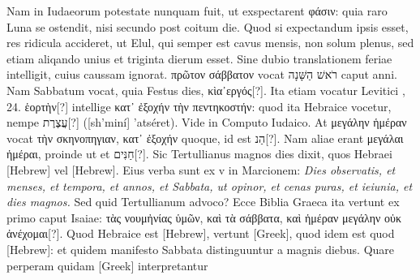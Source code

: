 Nam in Iudaeorum potestate
nunquam fuit, ut exspectarent \textgreek{φάσιν}:
 quia raro Luna se ostendit,
nisi secundo post coitum die.
Quod si expectandum ipsis esset,
res ridicula accideret, ut Elul, qui semper est cavus mensis, non solum
plenus, sed etiam aliqando unius et triginta dierum esset.
Sine dubio translationem feriae intelligit, cuius caussam ignorat.
\textgreek{πρῶτον σάββατον} vocat
 \texthebrew{רֹאשׁ הַשָּׁנָה‎}
 caput anni.
Nam Sabbatum vocat, quia Festus
dies, \textgreek{κὶα᾽εργός}[?].
Ita etiam vocatur Levitici , 24.
\textgreek{ἑορτὴν}[?]
 intellige
\textgreek{κατ᾽ ἐξοχήν τὴν πεντηκοστήν}:
 quod ita Hebraice vocetur, nempe \texthebrew{עֲצֶרֶת}[?] ([sh'miní] 'atséret).
Vide in Computo Iudaico.
At \textgreek{μεγάλην ἡμέραν}
 vocat \textgreek{τὴν σκηνοπηγιαν, κατ᾽ ἐξοχήν}
 quoque, id est \texthebrew{הַנ}[?].
Nam aliae erant \textgreek{μεγάλαι ἡμέραι},
proinde ut et \texthebrew{חַנִּים}[?].
Sic Tertullianus magnos dies dixit, quos
Hebraei \texthebrew{[Hebrew]} vel \texthebrew{[Hebrew]}.
Eius verba sunt ex v in Marcionem:
\textit{Dies observatis, et menses, et tempora, et annos, et Sabbata, ut opinor,
et cenas puras, et ieiunia, et dies magnos.}
Sed quid Tertullianum
advoco?
Ecce Biblia Graeca ita vertunt ex primo caput Isaiae:
\textgreek{τὰς νουμἠνίας ὑμῶν, καὶ τὰ σάββατα,
 καὶ ἡμέραν μεγάλην οὐκ ἀνέχομαι}[?].
Quod Hebraice est \texthebrew{[Hebrew]},
 vertunt \textgreek{[Greek]}, quod idem
est quod \texthebrew{[Hebrew]}: et quidem manifesto Sabbata distinguuntur a
magnis diebus. 
Quare perperam quidam \textgreek{[Greek]} interpretantur
